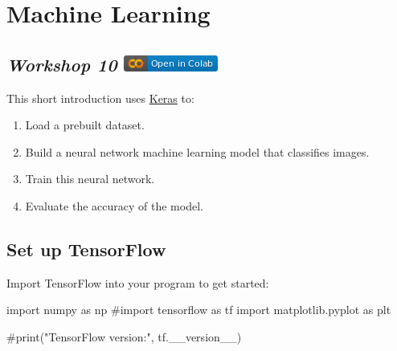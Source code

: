 \documentclass[
  letterpaper,
  DIV=11,
  numbers=noendperiod]{scrreprt}
\newenvironment{Shaded}{\begin{snugshade}}{\end{snugshade}}
\newcommand{\CommentTok}[1]{\textcolor[rgb]{0.37,0.37,0.37}{#1}}
\newcommand{\ImportTok}[1]{\textcolor[rgb]{0.00,0.46,0.62}{#1}}
\newcommand{\NormalTok}[1]{\textcolor[rgb]{0.00,0.23,0.31}{#1}}
\providecommand{\tightlist}{%
  \setlength{\itemsep}{0pt}\setlength{\parskip}{0pt}}\usepackage{longtable,booktabs,array}
\begin{document}

\hypertarget{machine-learning}{%
\chapter{Machine Learning}\label{machine-learning}}

\hypertarget{workshop-10-open-in-colab-1}{%
\section[\emph{Workshop 10} ]{\texorpdfstring{\emph{Workshop 10}
\href{https://colab.research.google.com/github/oballinger/QM2/blob/main/notebooks/W10.\%20Machine\%20Learning.ipynb}{\protect\includegraphics{index_files/mediabag/colab-badge.png}}}{Workshop 10 Open In Colab}}\label{workshop-10-open-in-colab-1}}

This short introduction uses
\href{https://www.tensorflow.org/guide/keras/overview}{Keras} to:

\begin{enumerate}
\def\labelenumi{\arabic{enumi}.}
\tightlist
\item
  Load a prebuilt dataset.
\item
  Build a neural network machine learning model that classifies images.
\item
  Train this neural network.
\item
  Evaluate the accuracy of the model.
\end{enumerate}

\hypertarget{set-up-tensorflow}{%
\section{Set up TensorFlow}\label{set-up-tensorflow}}

Import TensorFlow into your program to get started:

\begin{Shaded}
\begin{Highlighting}[]
\ImportTok{import}\NormalTok{ numpy }\ImportTok{as}\NormalTok{ np}
\CommentTok{\#import tensorflow as tf}
\ImportTok{import}\NormalTok{ matplotlib.pyplot }\ImportTok{as}\NormalTok{ plt}

\CommentTok{\#print("TensorFlow version:", tf.\_\_version\_\_)}
\end{Highlighting}
\end{Shaded}
\end{document}

